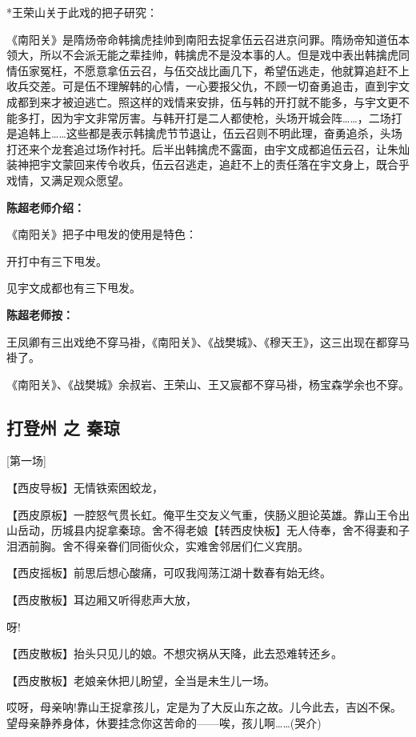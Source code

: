 *王荣山关于此戏的把子研究：

《南阳关》是隋炀帝命韩擒虎挂帅到南阳去捉拿伍云召进京问罪。隋炀帝知道伍本领大，所以不会派无能之辈挂帅，韩擒虎不是没本事的人。但是戏中表出韩擒虎同情伍家冤枉，不愿意拿伍云召，与伍交战比画几下，希望伍逃走，他就算追赶不上收兵交差。可是伍不理解韩的心情，一心要报父仇，不顾一切奋勇追击，直到宇文成都到来才被迫逃亡。照这样的戏情来安排，伍与韩的开打就不能多，与宇文更不能多打，因为宇文非常厉害。与韩开打是二人都使枪，头场开城会阵\ldots{}\ldots{}，二场打是追韩上\ldots{}\ldots{}这些都是表示韩擒虎节节退让，伍云召则不明此理，奋勇追杀，头场打还来个龙套追过场作衬托。后半出韩擒虎不露面，由宇文成都追伍云召，让朱灿装神把宇文蒙回来传令收兵，伍云召逃走，追赶不上的责任落在宇文身上，既合乎戏情，又满足观众愿望。

\textbf{陈超老师介绍：}

《南阳关》把子中甩发的使用是特色：

开打中有三下甩发。

见宇文成都也有三下甩发。

\textbf{陈超老师按：}

王凤卿有三出戏绝不穿马褂，《南阳关》、《战樊城》、《穆天王》，这三出现在都穿马褂了。

《南阳关》、《战樊城》余叔岩、王荣山、王又宸都不穿马褂，杨宝森学余也不穿。

\hypertarget{ux6253ux767bux5dde-ux4e4b-ux79e6ux743c}{%
\subsection{打登州 之
秦琼}\label{ux6253ux767bux5dde-ux4e4b-ux79e6ux743c}}

{[}第一场{]}

【西皮导板】无情铁索困蛟龙，

【西皮原板】一腔怒气贯长虹。俺平生交友义气重，侠肠义胆论英雄。靠山王令出山岳动，历城县内捉拿秦琼。舍不得老娘【转西皮快板】无人侍奉，舍不得妻和子泪洒前胸。舍不得亲眷们同衙伙众，实难舍邻居们仁义宾朋。

【西皮摇板】前思后想心酸痛，可叹我闯荡江湖十数春有始无终。

【西皮散板】耳边厢又听得悲声大放，

呀!

【西皮散板】抬头只见儿的娘。不想灾祸从天降，此去恐难转还乡。

【西皮散板】老娘亲休把儿盼望，全当是未生儿一场。

哎呀，母亲呐!靠山王捉拿孩儿，定是为了大反山东之故。儿今此去，吉凶不保。望母亲静养身体，休要挂念你这苦命的------唉，孩儿啊\ldots{}\ldots{}(哭介)

